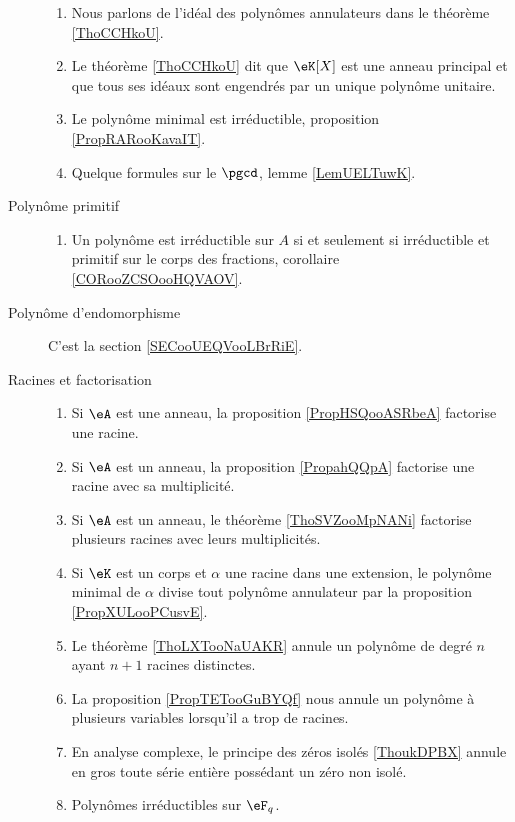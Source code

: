 \begin{description}
\begin{enumerate}
\item
Nous parlons de l'idéal des polynômes annulateurs dans le théorème \ref{ThoCCHkoU}.
            \item
                Le théorème \ref{ThoCCHkoU} dit que \( \eK[X]\) est une anneau principal et que tous ses idéaux sont engendrés par un unique polynôme unitaire.
            \item
                Le polynôme minimal est irréductible, proposition \ref{PropRARooKavaIT}.
            \item
                Quelque formules sur le \( \pgcd\), lemme \ref{LemUELTuwK}.
        \end{enumerate}
    \item[Polynôme primitif]
    
        \begin{enumerate}
            \item
                Un polynôme est irréductible sur \( A\) si et seulement si irréductible et primitif sur le corps des fractions, corollaire \ref{CORooZCSOooHQVAOV}.
        \end{enumerate}

    \item[Polynôme d'endomorphisme]
        C'est la section \ref{SECooUEQVooLBrRiE}.

    \item[Racines et factorisation]

    \begin{enumerate}
        \item
            Si \( \eA\) est une anneau, la proposition \ref{PropHSQooASRbeA} factorise une racine.
        \item
            Si \( \eA\) est un anneau, la proposition \ref{PropahQQpA} factorise une racine avec sa multiplicité.
        \item
            Si \( \eA\) est un anneau, le théorème \ref{ThoSVZooMpNANi} factorise plusieurs racines avec leurs multiplicités.
        \item
            Si \( \eK\) est un corps et \( \alpha\) une racine dans une extension, le polynôme minimal de \( \alpha\) divise tout polynôme annulateur par la proposition \ref{PropXULooPCusvE}.
        \item
            Le théorème \ref{ThoLXTooNaUAKR} annule un polynôme de degré \( n\) ayant \( n+1\) racines distinctes.
        \item
            La proposition \ref{PropTETooGuBYQf} nous annule un polynôme à plusieurs variables lorsqu'il a trop de racines.
        \item
            En analyse complexe, le principe des zéros isolés \ref{ThoukDPBX} annule en gros toute série entière possédant un zéro non isolé.
        \item 
            Polynômes irréductibles sur \( \eF_q\).
        \end{enumerate}

\end{description}



